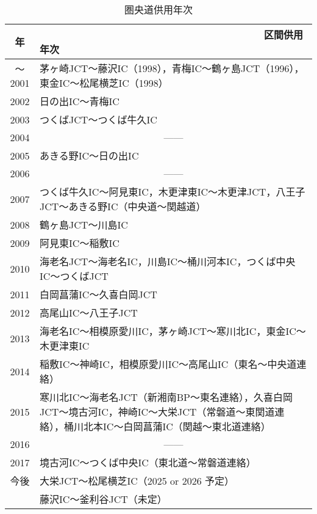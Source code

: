 \newpage
\begin{table}[H]
  \begin{center}
    \caption{圏央道供用年次}
    \vspace{1.5zw}
    \begin{tabular}{|c|p{11cm}|}\hline \label{圏央道供用年次}
      年 & ~~~~~~~~~~~~~~~~~~~~~~~~~~~~~~~~~~~~~~~~区間供用年次 \\ \hline \hline
      〜2001 & 茅ヶ崎JCT〜藤沢IC（1998），青梅IC〜鶴ヶ島JCT（1996），東金IC〜松尾横芝IC（1998） \\ \hline
      2002 & 日の出IC〜青梅IC \\ \hline
      2003 & つくばJCT〜つくば牛久IC \\ \hline
      2004 & \multicolumn{1}{|c|}{------} \\ \hline
      2005 & あきる野IC〜日の出IC \\ \hline
      2006 & \multicolumn{1}{|c|}{------} \\ \hline
      2007 & つくば牛久IC〜阿見東IC，木更津東IC〜木更津JCT，八王子JCT〜あきる野IC（中央道〜関越道） \\ \hline
      2008 & 鶴ヶ島JCT〜川島IC \\ \hline
      2009 & 阿見東IC〜稲敷IC \\ \hline
      2010 & 海老名JCT〜海老名IC，川島IC〜桶川河本IC，つくば中央IC〜つくばJCT \\ \hline
      2011 & 白岡菖蒲IC〜久喜白岡JCT \\ \hline
      2012 & 高尾山IC〜八王子JCT \\ \hline
      2013 & 海老名IC〜相模原愛川IC，茅ヶ崎JCT〜寒川北IC，東金IC〜木更津東IC \\ \hline
      2014 & 稲敷IC〜神崎IC，相模原愛川IC〜高尾山IC（東名〜中央道連絡） \\ \hline
      2015 & 寒川北IC〜海老名JCT（新湘南BP〜東名連絡），久喜白岡JCT〜境古河IC，神崎IC〜大栄JCT（常磐道〜東関道連絡），桶川北本IC〜白岡菖蒲IC（関越〜東北道連絡） \\ \hline
      2016 & \multicolumn{1}{|c|}{------} \\ \hline
      2017 & 境古河IC〜つくば中央IC（東北道〜常磐道連絡） \\ \hline
      今後 & 大栄JCT〜松尾横芝IC（2025 or 2026 予定）\\ \hline
      & 藤沢IC〜釜利谷JCT（未定） \\ \hline
    \end{tabular}
  \end{center}
\end{table}

